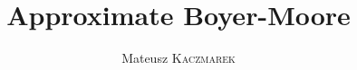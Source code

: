 \documentclass[12pt]{article}
\theoremstyle{plain}
\theoremstyle{definition}
\begin{document}
\title{Approximate Boyer-Moore\vspace{-2ex}}
\author{Mateusz \textsc{Kaczmarek}\vspace{-2ex}}
\date{}
\maketitle




\nocite{*}
\printbibliography
\end{document}
